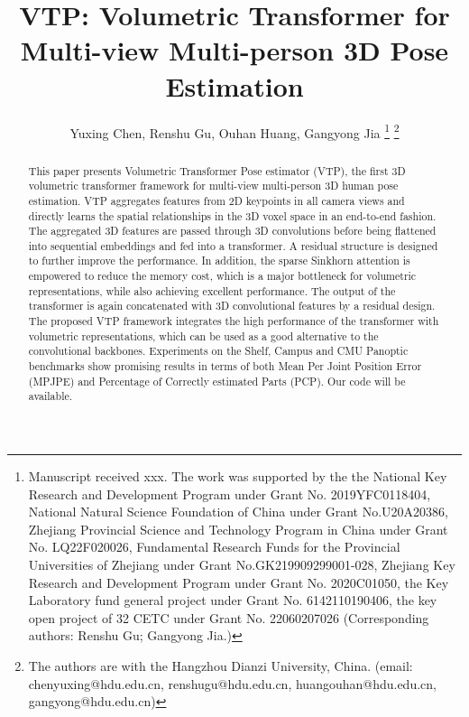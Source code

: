 \documentclass[lettersize,journal]{IEEEtran}
\begin{document}
\title{VTP: Volumetric Transformer for Multi-view Multi-person 3D Pose Estimation}

\author{Yuxing Chen, Renshu Gu, Ouhan Huang, Gangyong Jia
\thanks{Manuscript received xxx. The work was supported by the the National Key
Research and Development Program under Grant No. 2019YFC0118404, National Natural Science Foundation of China under Grant No.U20A20386, Zhejiang Provincial Science and Technology Program in China under Grant No. LQ22F020026, Fundamental Research Funds for the Provincial Universities of Zhejiang under Grant No.GK219909299001-028, Zhejiang Key Research and Development Program under Grant No. 2020C01050, the Key Laboratory fund general project under Grant No. 6142110190406, the key open project of 32 CETC under Grant No. 22060207026 (Corresponding authors: Renshu Gu; Gangyong Jia.)}
\thanks{The authors are with the Hangzhou Dianzi University, China. (email: chenyuxing@hdu.edu.cn, renshugu@hdu.edu.cn, huangouhan@hdu.edu.cn, gangyong@hdu.edu.cn)}}





\maketitle

\begin{abstract}
This paper presents Volumetric Transformer Pose estimator (VTP), the first 3D volumetric transformer framework for multi-view multi-person 3D human pose estimation. VTP aggregates features from 2D keypoints in all camera views and directly learns the spatial relationships in the 3D voxel space in an end-to-end fashion. The aggregated 3D features are passed through 3D convolutions before being flattened into sequential embeddings and fed into a transformer. A residual structure is designed to further improve the performance. In addition, the sparse Sinkhorn attention is empowered to reduce the memory cost, which is a major bottleneck for volumetric representations, while also achieving excellent performance. The output of the transformer is again concatenated with 3D convolutional features by a residual design. The proposed VTP framework integrates the high performance of the transformer with volumetric representations, which can be used as a good alternative to the convolutional backbones. Experiments on the Shelf, Campus and CMU Panoptic benchmarks show promising results in terms of both Mean Per Joint Position Error (MPJPE) and Percentage of Correctly estimated Parts (PCP). Our code will be available.
\end{abstract}
\end{document}
